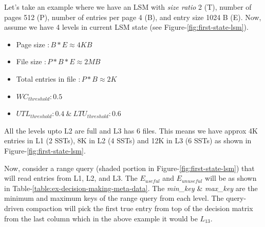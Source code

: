 Let's take an example where we have an LSM with \textit{size ratio} 2 (T), number of pages 512 (P), 
number of entries per page 4 (B), and entry size 1024 B (E). Now, assume we have 4 levels in current LSM state 
(see Figure-\ref{fig:first-state-lsm}).

\begin{itemize}
    \item Page size $\colon B * E \approx 4 KB$
    \item File size $\colon P * B * E \approx 2 MB$
    \item Total entries in file $\colon P * B \approx 2 K$
    \item $WC_{threshold} \colon 0.5$
    \item $UTL_{threshold} \colon 0.4\ \&\ LTU_{threshold} \colon 0.6$ 
\end{itemize}

All the levels upto L2 are full and L3 has 6 files. This means we have approx 4K entries in L1 (2 SSTs), 8K in 
L2 (4 SSTs) and 12K in L3 (6 SSTs) as shown in Figure-\ref{fig:first-state-lsm}.

Now, consider a range query (shaded portion in Figure-\ref{fig:first-state-lsm}) that will read entries from L1, L2, and L3.
The $E_{useful}$ and $E_{unuseful}$ will be as shown in Table-\ref{table:ex-decision-making-meta-data}. 
The \textit{min\_key} \& \textit{max\_key} are the minimum and maximum keys of the range query from each level. The 
query-driven compaction will pick the first true entry from top of the decision matrix from the last column which in the 
above example it would be $L_{13}$.

\begin{table}
    \caption{Decision Making Data }
    \label{table:ex-decision-making-meta-data}
\end{table}

